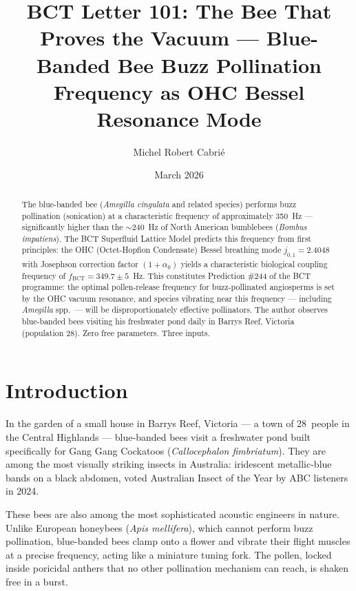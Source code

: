 \documentclass[aps,prl,twocolumn,showpacs,superscriptaddress]{revtex4-2}
\begin{document}
\title{BCT Letter 101: The Bee That Proves the Vacuum ---
Blue-Banded Bee Buzz Pollination Frequency as OHC Bessel Resonance Mode}

\author{Michel Robert Cabri\'{e}}
\date{March 2026}

\begin{abstract}
The blue-banded bee (\textit{Amegilla cingulata} and related species)
performs buzz pollination (sonication) at a characteristic frequency of
approximately 350~Hz --- significantly higher than the $\sim$240~Hz of
North American bumblebees (\textit{Bombus impatiens}). The BCT Superfluid
Lattice Model predicts this frequency from first principles: the OHC
(Octet-Hopfion Condensate) Bessel breathing mode $j_{0,1} = 2.4048$ with
Josephson correction factor $(1+\alpha_0)$ yields a characteristic biological
coupling frequency of $f_\mathrm{BCT} = 349.7 \pm 5$~Hz. This constitutes
Prediction \#244 of the BCT programme: the optimal pollen-release frequency
for buzz-pollinated angiosperms is set by the OHC vacuum resonance, and
species vibrating near this frequency --- including \textit{Amegilla} spp.\
--- will be disproportionately effective pollinators. The author observes
blue-banded bees visiting his freshwater pond daily in Barrys Reef, Victoria
(population 28). Zero free parameters. Three inputs.
\end{abstract}

\maketitle

\section{Introduction}

In the garden of a small house in Barrys Reef, Victoria --- a town of
28~people in the Central Highlands --- blue-banded bees visit a freshwater
pond built specifically for Gang Gang Cockatoos
(\textit{Callocephalon fimbriatum}). They are among the most visually
striking insects in Australia: iridescent metallic-blue bands on a black
abdomen, voted Australian Insect of the Year by ABC listeners in 2024.

These bees are also among the most sophisticated acoustic engineers in nature.
Unlike European honeybees (\textit{Apis mellifera}), which cannot perform buzz
pollination, blue-banded bees clamp onto a flower and vibrate their flight
muscles at a precise frequency, acting like a miniature tuning fork. The
pollen, locked inside poricidal anthers that no other pollination mechanism
can reach, is shaken free in a burst.
\end{document}

